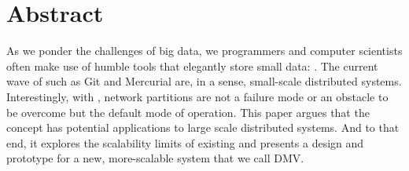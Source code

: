 \chapter{Abstract}



As we ponder the challenges of big data, we programmers and computer scientists
often make use of humble tools that elegantly store small data: .
The current wave of  such as Git and Mercurial are, in a sense,
small-scale distributed systems. Interestingly, with , network
partitions are not a failure mode or an obstacle to be overcome but the default
mode of operation. This paper argues that the  concept has potential applications to large scale distributed systems.
And to that end, it explores the scalability limits of existing 
and presents a design and prototype for a new, more-scalable system that we call
\gls{DMV}.
